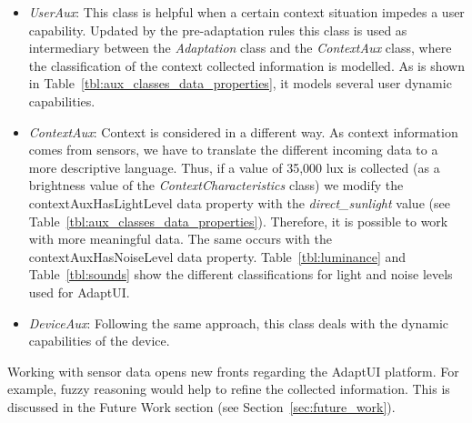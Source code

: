 \begin{itemize}
 \item \textit{UserAux}: This class is helpful when a certain context situation
 impedes a user capability. Updated by the pre-adaptation rules this class is used
 as intermediary between the \textit{Adaptation} class and the \textit{ContextAux}
 class, where the classification of the context collected information is modelled.
 As is shown in Table~\ref{tbl:aux_classes_data_properties}, it models several user
 dynamic capabilities.
 
 \item \textit{ContextAux}: Context is considered in a different way. As context
 information comes from sensors, we have to translate the different incoming data
 to a more descriptive language. Thus, if a value of 35,000 lux is collected (as
 a brightness value of the \textit{ContextCharacteristics} class) we modify the
 contextAuxHasLightLevel data property with the \textit{direct\_sunlight} value (see
 Table~\ref{tbl:aux_classes_data_properties}). Therefore, it is possible to work
 with more meaningful data. The same occurs with the contextAuxHasNoiseLevel
 data property. Table~\ref{tbl:luminance} and Table~\ref{tbl:sounds} show the
 different classifications for light and noise levels used for AdaptUI.
 
 \item \textit{DeviceAux}: Following the same approach, this class deals with the
 dynamic capabilities of the device.
\end{itemize}

Working with sensor data opens new fronts regarding the AdaptUI platform. For
example, fuzzy reasoning would help to refine the collected information. This
is discussed in the Future Work section (see Section~\ref{sec:future_work}).


